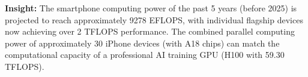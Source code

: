 \begin{insights}
    \textbf{Insight:} 
    The smartphone computing power of the past 5 years (before 2025) is projected to reach approximately 9278 EFLOPS, with individual flagship devices now achieving over 2 TFLOPS performance. The combined parallel computing power of approximately 30 iPhone devices (with A18 chips) can match the computational capacity of a professional AI training GPU (H100 with 59.30 TFLOPS). 
\end{insights}



